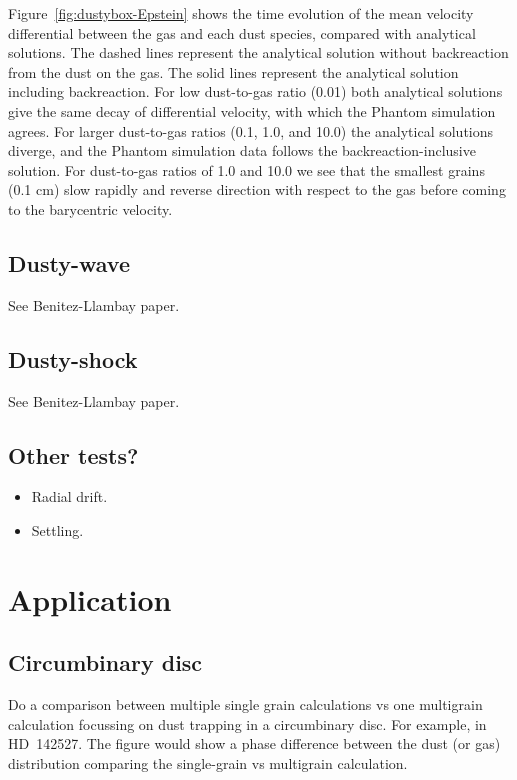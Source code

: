 \documentclass[fleqn,usenatbib]{mnras}
\begin{document}
Figure~\ref{fig:dustybox-Epstein} shows the time evolution of the mean velocity
differential between the gas and each dust species, compared with analytical
solutions. The dashed lines represent the analytical solution without
backreaction from the dust on the gas. The solid lines represent the analytical
solution including backreaction. For low dust-to-gas ratio (0.01) both
analytical solutions give the same decay of differential velocity, with which
the Phantom simulation agrees. For larger dust-to-gas ratios (0.1, 1.0, and
10.0) the analytical solutions diverge, and the Phantom simulation data follows
the backreaction-inclusive solution. For dust-to-gas ratios of 1.0 and 10.0 we
see that the smallest grains (0.1 cm) slow rapidly and reverse direction with
respect to the gas before coming to the barycentric velocity.

\subsection{Dusty-wave}

See Benitez-Llambay paper.

\subsection{Dusty-shock}

See Benitez-Llambay paper.

\subsection{Other tests?}

\begin{itemize}
   \item Radial drift.
   \item Settling.
\end{itemize}

\section{Application}

\subsection{Circumbinary disc}

Do a comparison between multiple single grain calculations vs one multigrain
calculation focussing on dust trapping in a circumbinary disc. For example, in
HD~142527. The figure would show a phase difference between the dust (or gas)
distribution comparing the single-grain vs multigrain calculation.
\end{document}
